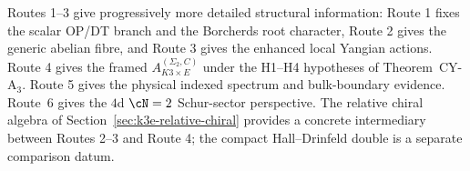 \begin{remark}
\label{rem:k3e-route-comparison}
Routes 1--3 give progressively more detailed structural information:
Route 1 fixes the scalar OP/DT branch and the Borcherds root character,
Route 2 gives the generic abelian fibre, and Route 3 gives the enhanced
local Yangian actions. Route 4 gives the framed
$A_{K3 \times E}^{(\Sigma_2,C)}$ under the H1--H4 hypotheses of
Theorem~CY-A$_3$. Route 5 gives the physical indexed spectrum and
bulk-boundary evidence. Route~6 gives the $4$d $\cN = 2$ Schur-sector
perspective. The relative chiral algebra of
Section~\ref{sec:k3e-relative-chiral} provides a concrete intermediary
between Routes 2--3 and Route 4; the compact Hall--Drinfeld double is a
separate comparison datum.
\end{remark}

